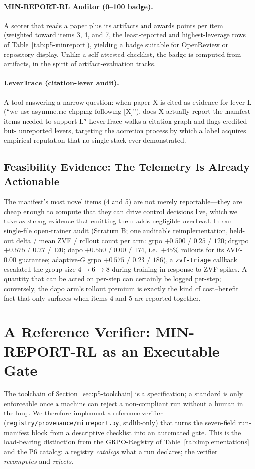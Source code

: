 \documentclass{article}  \usepackage[preprint,nonatbib]{neurips_2026} \usepackage[numbers]{natbib}
\providecommand{\tableref}[1]{Table~\ref{#1}}
\providecommand{\secref}[1]{Section~\ref{#1}}
\begin{document}
\paragraph{MIN-REPORT-RL Auditor (0--100 badge).} A scorer that reads a paper
plus its artifacts and awards points per item (weighted toward items 3, 4,
and 7, the least-reported and highest-leverage rows of
\tableref{tab:p5-minreport}), yielding a badge suitable for OpenReview or
repository display. Unlike a self-attested checklist, the badge is computed
from artifacts, in the spirit of artifact-evaluation tracks.

\paragraph{LeverTrace (citation-lever audit).} A tool answering a narrow
question: when paper X is cited as evidence for lever L (``we use asymmetric
clipping following [X]''), does X actually report the manifest items needed
to support L? LeverTrace walks a citation graph and flags credited-but-
unreported levers, targeting the accretion process by which a label acquires
empirical reputation that no single stack ever demonstrated.

\subsection{Feasibility Evidence: The Telemetry Is Already Actionable}
\label{sec:p5-feasibility}
The manifest's most novel items (4 and 5) are not merely reportable---they
are cheap enough to compute that they can drive control decisions live, which
we take as strong evidence that emitting them adds negligible overhead. In
our single-file open-trainer audit (Stratum B; one auditable
reimplementation, held-out delta / mean ZVF / rollout count per arm:
grpo $+0.500$ / $0.25$ / $120$; drgrpo $+0.575$ / $0.27$ / $120$; dapo
$+0.550$ / $0.00$ / $174$, i.e.\ $+45\%$ rollouts for its ZVF-$0.00$
guarantee; adaptive-$G$ grpo $+0.575$ / $0.23$ / $186$), a
\texttt{zvf-triage} callback escalated the group size $4 \to 6 \to 8$ during
training in response to ZVF spikes. A quantity that can be acted on per-step
can certainly be logged per-step; conversely, the dapo arm's rollout premium
is exactly the kind of cost--benefit fact that only surfaces when items 4 and
5 are reported together.
 \section{A Reference Verifier: MIN-REPORT-RL as an Executable Gate}
\label{sec:p5-verifier}
The toolchain of \secref{sec:p5-toolchain} is a specification; a standard is
only enforceable once a machine can reject a non-compliant run without a human
in the loop. We therefore implement a reference verifier
(\texttt{registry/provenance/minreport.py}, stdlib-only) that turns the
seven-field run-manifest block from a descriptive checklist into an automated gate. This is
the load-bearing distinction from the GRPO-Registry of \tableref{tab:implementations}
and the P6 catalog: a registry \emph{catalogs} what a run declares; the verifier
\emph{recomputes} and \emph{rejects}.
\end{document}
